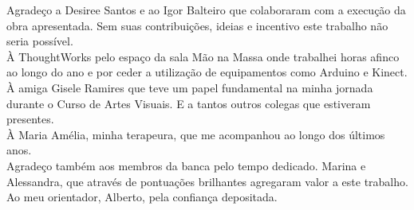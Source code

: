 \begin{agradecimento}

Agradeço a Desiree Santos e ao Igor Balteiro que colaboraram com a execução da obra apresentada. Sem suas contribuições, ideias e incentivo este trabalho não seria possível.\\

À ThoughtWorks pelo espaço da sala Mão na Massa onde trabalhei horas afinco ao longo do ano e por ceder a utilização de equipamentos como Arduino e Kinect.\\

À amiga Gisele Ramires que teve um papel fundamental na minha jornada durante o Curso de Artes Visuais. E a tantos outros colegas que estiveram presentes.\\

À Maria Amélia, minha terapeura, que me acompanhou ao longo dos últimos anos.\\

Agradeço também aos membros da banca pelo tempo dedicado. Marina e Alessandra, que através de pontuações brilhantes agregaram valor a este trabalho. \\

Ao meu orientador, Alberto, pela confiança depositada.\\

\end{agradecimento}